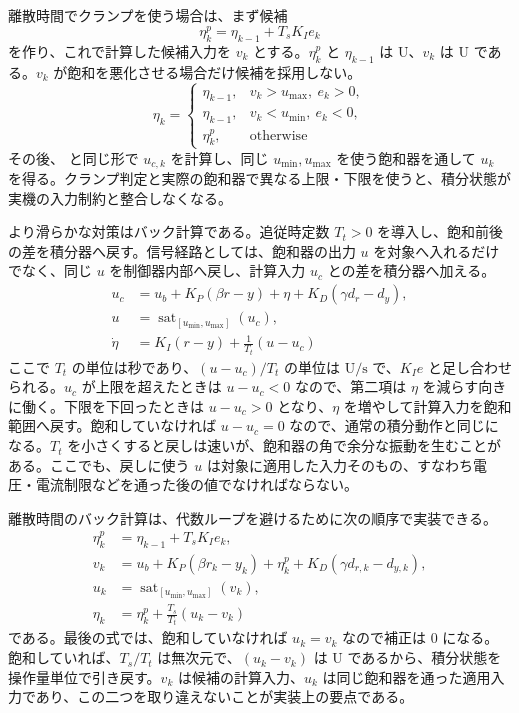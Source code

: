 離散時間でクランプを使う場合は、まず候補
\begin{equation}
  \eta_k^p=\eta_{k-1}+T_sK_Ie_k
\end{equation}
を作り、これで計算した候補入力を $v_k$ とする。$\eta_k^p$ と $\eta_{k-1}$ は $\mathrm{U}$、$v_k$ は $\mathrm{U}$ である。$v_k$ が飽和を悪化させる場合だけ候補を採用しない。
\begin{equation}
  \eta_k=
  \begin{cases}
    \eta_{k-1}, & v_k>u_{\max},\ e_k>0,\\
    \eta_{k-1}, & v_k<u_{\min},\ e_k<0,\\
    \eta_k^p, & \text{otherwise}
  \end{cases}
  \label{eq:integrator-clamping-discrete}
\end{equation}
その後、 と同じ形で $u_{c,k}$ を計算し、同じ $u_{\min},u_{\max}$ を使う飽和器を通して $u_k$ を得る。クランプ判定と実際の飽和器で異なる上限・下限を使うと、積分状態が実機の入力制約と整合しなくなる。

より滑らかな対策はバック計算である。追従時定数 $T_t>0$ を導入し、飽和前後の差を積分器へ戻す。信号経路としては、飽和器の出力 $u$ を対象へ入れるだけでなく、同じ $u$ を制御器内部へ戻し、計算入力 $u_c$ との差を積分器へ加える。
\begin{align}
  u_c&=u_b+K_P(\beta r-y)+\eta
  +K_D(\gamma d_r-d_y),\\
  u&=\operatorname{sat}_{[u_{\min},u_{\max}]}(u_c),\\
  \dot{\eta}&=K_I(r-y)+\frac{1}{T_t}(u-u_c)
  \label{eq:back-calculation-continuous}
\end{align}
ここで $T_t$ の単位は秒であり、$(u-u_c)/T_t$ の単位は $\mathrm{U}/\mathrm{s}$ で、$K_Ie$ と足し合わせられる。$u_c$ が上限を超えたときは $u-u_c<0$ なので、第二項は $\eta$ を減らす向きに働く。下限を下回ったときは $u-u_c>0$ となり、$\eta$ を増やして計算入力を飽和範囲へ戻す。飽和していなければ $u-u_c=0$ なので、通常の積分動作と同じになる。$T_t$ を小さくすると戻しは速いが、飽和器の角で余分な振動を生むことがある。ここでも、戻しに使う $u$ は対象に適用した入力そのもの、すなわち電圧・電流制限などを通った後の値でなければならない。

離散時間のバック計算は、代数ループを避けるために次の順序で実装できる。
\begin{align}
  \eta_k^p&=\eta_{k-1}+T_sK_Ie_k,\\
  v_k&=u_b+K_P(\beta r_k-y_k)+\eta_k^p
  +K_D(\gamma d_{r,k}-d_{y,k}),\\
  u_k&=\operatorname{sat}_{[u_{\min},u_{\max}]}(v_k),\\
  \eta_k&=\eta_k^p+\frac{T_s}{T_t}(u_k-v_k)
  \label{eq:back-calculation-discrete}
\end{align}
である。最後の式では、飽和していなければ $u_k=v_k$ なので補正は 0 になる。飽和していれば、$T_s/T_t$ は無次元で、$(u_k-v_k)$ は $\mathrm{U}$ であるから、積分状態を操作量単位で引き戻す。$v_k$ は候補の計算入力、$u_k$ は同じ飽和器を通った適用入力であり、この二つを取り違えないことが実装上の要点である。

